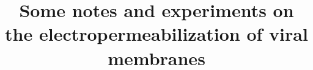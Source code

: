 \documentclass[paper.tex]{subfiles}
\begin{document}




\title{Some notes and experiments on the electropermeabilization of viral membranes}
\date{}


\flushbottom 
\maketitle
\thispagestyle{empty}

\renewcommand{\abstractname}{Summary}    %
\end{document}
